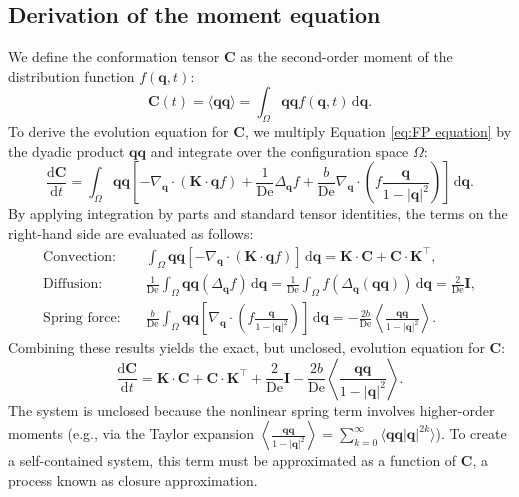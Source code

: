 \documentclass[preprint,12pt]{elsarticle}
\begin{document}
\subsection{Derivation of the moment equation}
We define the conformation tensor $\bm{C}$ as the second-order moment of the distribution function $f(\bm{q}, t)$:
\begin{equation}
    \bm{C}(t) = \langle \bm{q}\bm{q} \rangle = \int_{\Omega} \bm{q}\bm{q} f(\bm{q}, t) \,\mathrm{d}\bm{q}.
\end{equation}
To derive the evolution equation for $\bm{C}$, we multiply Equation \eqref{eq:FP equation} by the dyadic product $\bm{q}\bm{q}$ and integrate over the configuration space $\Omega$:
\begin{equation}
    \frac{\mathrm{d}\bm{C}}{\mathrm{d}t} = \int_{\Omega}\bm{q}\bm{q}\left[-\nabla_{\bm{q}}\cdot(\bm{K}\cdot \bm{q}f)+\frac{1}{\mathrm{De}}\Delta_{\bm{q}}f+\frac{b}{\mathrm{De}}\nabla_{\bm{q}}\cdot\left(f\frac{\bm{q}}{1-|\bm{q}|^2}\right)\right]\,\mathrm{d}\bm{q}.\label{eq:C1}
\end{equation}
By applying integration by parts and standard tensor identities, the terms on the right-hand side are evaluated as follows:
\begin{align*}
    \text{Convection:} \quad & \int_{\Omega} \bm{q}\bm{q} \left[ -\nabla_{\bm{q}}\cdot(\bm{K}\cdot \bm{q}f) \right]\,\mathrm{d}\bm{q} = \bm{K} \cdot \bm{C} + \bm{C} \cdot \bm{K}^\top, \\
    \text{Diffusion:} \quad & \frac{1}{\mathrm{De}} \int_{\Omega} \bm{q}\bm{q} (\Delta_{\bm{q}}f)\,\mathrm{d}\bm{q} = \frac{1}{\mathrm{De}} \int_{\Omega} f (\Delta_{\bm{q}}(\bm{q}\bm{q}))\,\mathrm{d}\bm{q} = \frac{2}{\mathrm{De}}\bm{I}, \\
    \text{Spring force:} \quad & \frac{b}{\mathrm{De}} \int_{\Omega} \bm{q}\bm{q} \left[ \nabla_{\bm{q}}\cdot\left(f\frac{\bm{q}}{1-|\bm{q}|^2}\right) \right]\,\mathrm{d}\bm{q} = -\frac{2b}{\mathrm{De}} \left\langle \frac{\bm{q}\bm{q}}{1-|\bm{q}|^2} \right\rangle.
\end{align*}
Combining these results yields the exact, but unclosed, evolution equation for $\bm{C}$:
\begin{equation}
    \frac{\mathrm{d}\bm{C}}{\mathrm{d}t}=\bm{K} \cdot \bm{C} + \bm{C} \cdot \bm{K}^\top + \frac{2}{\mathrm{De}}\bm{I} - \frac{2b}{\mathrm{De}} \left\langle \frac{\bm{q}\bm{q}}{1-|\bm{q}|^2} \right\rangle.\label{eq:C_unclosed}
\end{equation}
The system is unclosed because the nonlinear spring term involves higher-order moments (e.g., via the Taylor expansion $\left\langle \frac{\bm{q}\bm{q}}{1-|\bm{q}|^2} \right\rangle = \sum_{k=0}^{\infty} \langle \bm{q}\bm{q} |\bm{q}|^{2k} \rangle$). To create a self-contained system, this term must be approximated as a function of $\bm{C}$, a process known as closure approximation.
\end{document}
